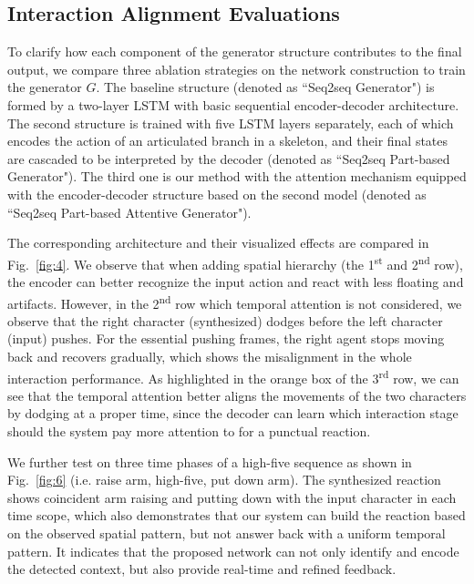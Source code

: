 \documentclass[times,twocolumn,final]{elsarticle}
\begin{document}
\subsection{Interaction Alignment Evaluations}
\label{sec:4.2}
To clarify how each component of the generator structure contributes to the final output, we compare three ablation strategies on the network construction to train the generator $G$. The baseline structure (denoted as ``Seq2seq Generator") is formed by a two-layer LSTM with basic sequential encoder-decoder architecture. The second structure is trained with five LSTM layers separately, each of which encodes the action of an articulated branch in a skeleton, and their final states are cascaded to be interpreted by the decoder (denoted as ``Seq2seq Part-based Generator"). The third one is our method with the attention mechanism equipped with the encoder-decoder structure based on the second model (denoted as ``Seq2seq Part-based Attentive Generator"). 

The corresponding architecture and their visualized effects are compared in Fig.~\ref{fig:4}. We observe that when adding spatial hierarchy (the 1\textsuperscript{st} and 2\textsuperscript{nd} row), the encoder can better recognize the input action and react with less floating and artifacts. However, in the 2\textsuperscript{nd} row which temporal attention is not considered, we observe that the right character (synthesized) dodges before the left character (input) pushes. For the essential pushing frames, the right agent stops moving back and recovers gradually, which shows the misalignment in the whole interaction performance. As highlighted in the orange box of the 3\textsuperscript{rd} row, we can see that the temporal attention better aligns the movements of the two characters by dodging at a proper time, since the decoder can learn which interaction stage should the system pay more attention to for a punctual reaction.

We further test on three time phases of a high-five sequence as shown in Fig.~\ref{fig:6} (i.e. raise arm, high-five, put down arm). The synthesized reaction shows coincident arm raising and putting down with the input character in each time scope, which also demonstrates that our system can build the reaction based on the observed spatial pattern, but not answer back with a uniform temporal pattern. It indicates that the proposed network can not only identify and encode the detected context, but also provide real-time and refined feedback.
\end{document}
